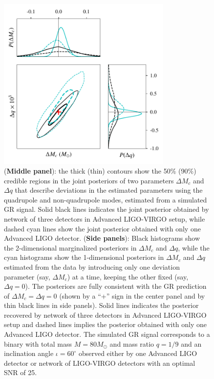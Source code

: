 \documentclass[prd,preprintnumbers,twocolumn,eqsecnum,floatfix,a4paper,nofootinbib,superscriptaddress]{revtex4}
\begin{document}
\begin{figure}[htb] \begin{center}
		\includegraphics[width=3.4in]{figs/hm_mcq_1det_3det_compare_GR.pdf}
		\caption{(\textbf{Middle panel}): the thick (thin) contours show the 50\% (90\%) credible regions in the joint posteriors of two parameters $\Delta M_c$ and $\Delta q$ that describe deviations in the estimated parameters using the quadrupole and non-quadrupole modes, estimated from a simulated GR signal. Solid black lines indicates the joint posterior obtained by network of three detectors in Advanced LIGO-VIRGO setup, while dashed cyan lines show the  joint posterior obtained with only one Advanced LIGO detector. (\textbf{Side panels}): Black histograms show the 2-dimensional marginalized posteriors in $\Delta M_c$ and $\Delta q$, while the cyan histograms show the 1-dimensional posteriors in $\Delta M_c$ and $\Delta q$ estimated from the data by introducing only one deviation parameter (say, $\Delta M_c$) at a time, keeping the other fixed (say, $\Delta q = 0$). The posteriors are fully consistent with the GR prediction of $\Delta M_c = \Delta q = 0$ (shown by a ``+'' sign in the center panel and by thin black lines in side panels).  Solid lines indicates the posterior recovered by network of three detectors in Advanced LIGO-VIRGO setup and dashed lines implies the posterior obtained with only one Advanced LIGO detector. The simulated GR signal corresponds to a binary with total mass $M = {80}M_\odot$ and mass ratio $q = 1/9$ and an inclination angle $\iota = {60^\circ}$ observed either by one Advanced LIGO detector or network of LIGO-VIRGO detectors with an optimal SNR of 25. }
		\label{fig:hm_mcq_compare-1det_3det_GR_inj}
	\end{center} \end{figure}
\end{document}
